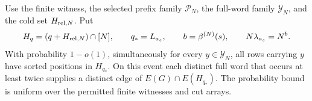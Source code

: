 \begin{lemma}
\label{lem:localization}
Use the finite witness, the selected prefix family \(\mathcal P_N\),
the full-word family \(\mathcal Y_N\), and the cold set
\(H_{{\rm rel},N}\).  Put
\[
 H_q=(q+H_{{\rm rel},N})\cap[N],\qquad q_*=L_{a_s},\qquad
 b=\beta^{(N)}(s),\qquad N\lambda_{a_s}=N^b.
\]
With probability \(1-o(1)\), simultaneously for every
\(y\in\mathcal Y_N\), all rows carrying \(y\) have sorted
positions in \(H_{q_*}\).  On this event each distinct full word
that occurs at least twice supplies a distinct edge of
\(E(G)\cap E(H_{q_*})\).  The probability bound is uniform over
the permitted finite witnesses and cut arrays.
\end{lemma}

